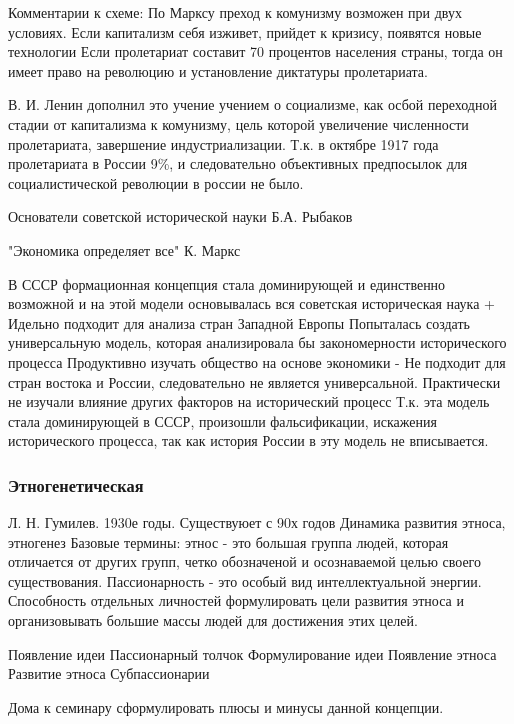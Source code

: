 \documentclass[a4paper]{article}
\begin{document}
Комментарии к схеме:
По Марксу преход к комунизму возможен при двух условиях. 
    Если капитализм себя изживет, прийдет к кризису, появятся новые технологии
    Если пролетариат составит 70 процентов населения страны, тогда он имеет право на революцию и установление диктатуры пролетариата.

    В. И. Ленин дополнил это учение учением о социализме, как осбой переходной стадии от капитализма к комунизму, цель которой увеличение численности пролетариата, завершение индустриализации. Т.к. в октябре 1917 года пролетариата в России 9\%, и следовательно объективных предпосылок для социалистической революции в россии не было.

Основатели советской исторической науки
    Б.А. Рыбаков

"Экономика определяет все" К. Маркс

В СССР формационная концепция стала доминирующей и единственно возможной и на этой модели основывалась вся советская историческая наука
+ 
    Идельно подходит для анализа стран Западной Европы
    Попыталась создать универсальную модель, которая анализировала бы закономерности исторического процесса
    Продуктивно изучать общество на основе экономики
-
    Не подходит для стран востока и России, следовательно не является универсальной. 
    Практически не изучали влияние других факторов на исторический процесс
    Т.к. эта модель стала доминирующей в СССР, произошли фальсификации, искажения исторического процесса, так как история России в эту модель не вписывается.

\subsubsection{Этногенетическая}
    Л. Н. Гумилев. 1930е годы. Существуюет с 90х годов
    Динамика развития этноса, этногенез
    Базовые термины: этнос - это большая группа людей, которая отличается от других групп,
    четко обозначеной и осознаваемой целью своего существования. Пассионарность - это особый вид интеллектуальной энергии. Способность отдельных личностей формулировать цели развития этноса и организовывать большие массы людей для достижения этих целей.
    
    Появление идеи
    Пассионарный толчок
    Формулирование идеи
    Появление этноса
    Развитие этноса
    Субпассионарии

    Дома к семинару сформулировать плюсы и минусы данной концепции.
\end{document}
